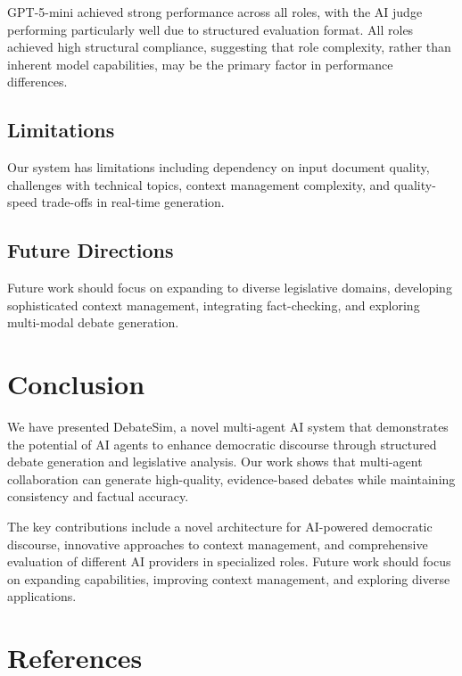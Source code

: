 \documentclass{article}
\begin{document}
GPT-5-mini achieved strong performance across all roles, with the AI judge performing particularly well due to structured evaluation format. All roles achieved high structural compliance, suggesting that role complexity, rather than inherent model capabilities, may be the primary factor in performance differences.

\subsection{Limitations}

Our system has limitations including dependency on input document quality, challenges with technical topics, context management complexity, and quality-speed trade-offs in real-time generation.

\subsection{Future Directions}

Future work should focus on expanding to diverse legislative domains, developing sophisticated context management, integrating fact-checking, and exploring multi-modal debate generation.



\section{Conclusion}

We have presented DebateSim, a novel multi-agent AI system that demonstrates the potential of AI agents to enhance democratic discourse through structured debate generation and legislative analysis. Our work shows that multi-agent collaboration can generate high-quality, evidence-based debates while maintaining consistency and factual accuracy.

The key contributions include a novel architecture for AI-powered democratic discourse, innovative approaches to context management, and comprehensive evaluation of different AI providers in specialized roles. Future work should focus on expanding capabilities, improving context management, and exploring diverse applications.

\section*{References}

\medskip
\end{document}
